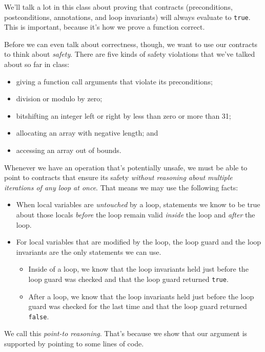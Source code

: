 \clearpage
{}

We'll talk a lot in this class about proving that contracts
(preconditions, postconditions, annotations, and loop invariants) will
always evaluate to \lstinline'true'. This is important, because it's how we
prove a function correct.

Before we can even talk about correctness, though, we want to use our
contracts to think about \emph{safety}. There are five kinds of
safety violations that we've talked about so far in class:

\begin{itemize}
\item giving a function call arguments that violate its preconditions;
\item division or modulo by zero;
\item bitshifting an integer left or right by less than zero or more than
  31;
\item allocating an array with negative length; and
\item accessing an array out of bounds.
\end{itemize}

Whenever we have an operation that's potentially unsafe, we must be
able to point to contracts that ensure its safety \emph{without
  reasoning about multiple iterations of any loop at once}. That means
we may use the following facts:
\begin{itemize}
\item%
  When local variables are \emph{untouched} by a loop, statements we
  know to be true about those locals \emph{before} the loop remain
  valid \emph{inside} the loop and \emph{after} the loop.

\item%
  For local variables that are modified by the loop, the loop guard
  and the loop invariants are the only statements we can use.
  \begin{itemize}
  \item%
    Inside of a loop, we know that the loop invariants held just before the
    loop guard was checked and that the loop guard returned \lstinline'true'.
  \item%
    After a loop, we know that the loop invariants held just before the loop
    guard was checked for the last time and that the loop guard returned
    \lstinline'false'.
  \end{itemize}
\end{itemize}
We call this \emph{point-to reasoning}.  That's because we show that
our argument is supported by pointing to some lines of code.

